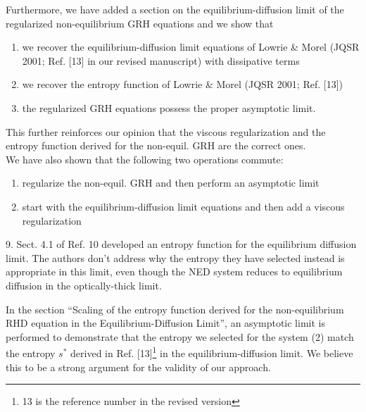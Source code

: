 \documentclass{article}
\begin{document}
Furthermore, we have added a section on the equilibrium-diffusion limit of the regularized non-equilibrium GRH equations and we show that  
\begin{enumerate}
\item we recover the equilibrium-diffusion limit equations of Lowrie \& Morel (JQSR 2001; Ref. [13] in our revised manuscript) with dissipative terms
\item we recover the entropy function of Lowrie \& Morel (JQSR 2001; Ref. [13])
\item the regularized GRH equations possess the proper asymptotic limit.
\end{enumerate}
This further reinforces our opinion that the viscous regularization and the entropy function derived for the non-equil. GRH are the correct ones.\\

We have also shown that the following two operations commute:
\begin{enumerate}
\item regularize the non-equil. GRH and then perform an asymptotic limit
\item start with the equilibrium-diffusion limit equations and then add a viscous regularization
\end{enumerate}
 
\bigskip


{
\color{blue}
9. Sect. 4.1 of Ref. 10 developed an entropy function for the equilibrium diffusion limit. The authors don't address why the entropy they have selected instead is appropriate in this limit, even though the NED system reduces to equilibrium diffusion in the optically-thick limit.
}

In the section ``Scaling of the entropy function derived for the non-equilibrium RHD equation in the Equilibrium-Diffusion Limit'', an asymptotic limit is performed to demonstrate that the entropy we selected for the system (2) match the entropy $s^*$ derived in Ref. [13]\footnote{13 is the reference number in the revised version} in the equilibrium-diffusion limit. We believe this to be a strong argument for the validity of our approach.
\bigskip
\end{document}
